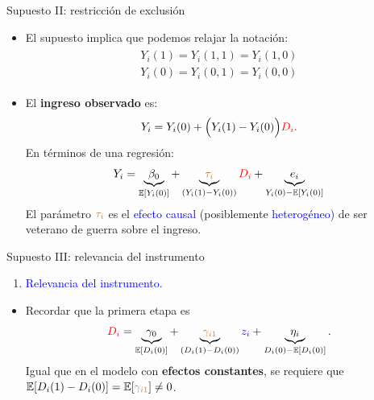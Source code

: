 \documentclass[10pt, xcolor=dvipsnames]{beamer}
\begin{document}
\begin{frame}{Supuesto II: restricción de exclusión}
\begin{itemize}
	\item El supuesto implica que podemos relajar la notación: 
	\begin{align*}
	\begin{split}
	Y_i(1) = Y_i(1,1) = Y_i(1,0)	\\
	Y_i(0) = Y_i(0,1) = Y_i(0,0) 
	\end{split}
	\end{align*}
    \item El \textbf{ingreso observado} es:
	\begin{align*}
	\begin{split}
	Y_i = Y_i(0) + \Big(Y_i(1)-Y_i(0)\Big)\textcolor{red}{D_i}. \\
	\end{split}
	\end{align*}
    En términos de una regresión:
	\begin{align*}
	Y_i = \underbrace{\beta_0}_{\operatorname{\mathbb{E}}[Y_i(0)]} + \underbrace{\textcolor{brown}{\tau_{i}}}_{(Y_i(1)-Y_i(0))} \textcolor{red}{D_i} + \underbrace{e_i}_{Y_i(0)-\operatorname{\mathbb{E}}[Y_i(0)]}   
	\end{align*}
	El parámetro $\textcolor{brown}{\tau_{i}}$ es el \textcolor{blue}{efecto causal} (posiblemente \textcolor{blue}{heterogéneo}) de ser veterano de guerra sobre el ingreso.
\end{itemize}
\end{frame}


\begin{frame}{Supuesto III: relevancia del instrumento}
	\begin{enumerate}
		\item[III.] \textcolor{blue}{Relevancia del instrumento.} 
		\end{enumerate}	
	\begin{itemize}
		\item Recordar que la primera etapa es
		\begin{align*}
		\textcolor{red}{D_i} = \underbrace{\gamma_0}_{\operatorname{\mathbb{E}}[D_i(0)]} + \underbrace{\textcolor{brown}{\gamma_{i1}}}_{(D_i(1)-D_i(0))} \textcolor{blue}{z_i}+ \underbrace{\eta_i}_{D_i(0)-\operatorname{\mathbb{E}}[D_i(0)]}.    
		\end{align*}
	    Igual que en el modelo con \textbf{efectos constantes}, se requiere que $\operatorname{\mathbb{E}}[D_i(1)-D_i(0)]=\operatorname{\mathbb{E}}[\textcolor{brown}{\gamma_{i1}}]\neq0$.
	\end{itemize}	 
\end{frame}
\end{document}
